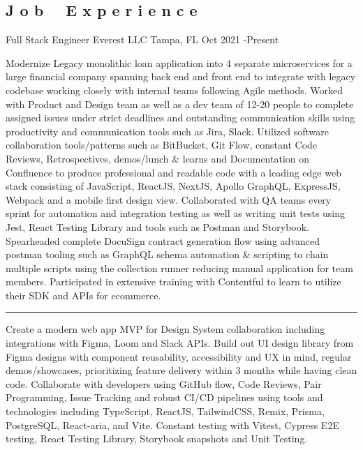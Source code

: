 \documentclass{resume}
\begin{document}

\subsection{J o b \ \ E x p e r i e n c e}

\jobInfoLocationDate
  {Full Stack Engineer}
  {Everest LLC}
  {Tampa, FL}
  {Oct 2021 \hyphen Present}


\begin{itemize}
\li Modernize Legacy monolithic loan application into 4 separate microservices for a large financial company spanning back end and front end to integrate with legacy codebase working closely with internal teams following Agile methods.
\li Worked with Product and Design team as well as a dev team of 12-20 people to complete assigned issues under strict deadlines and outstanding communication skills using productivity and communication tools such as Jira, Slack.
\li Utilized software collaboration tools/patterns such as BitBucket, Git Flow, constant Code Reviews, Retrospectives, demos/lunch \& learns  and Documentation on Confluence to produce professional and readable code with a leading edge web stack consisting of JavaScript, ReactJS, NextJS, Apollo GraphQL, ExpressJS, Webpack and a mobile first design view.
\li Collaborated with QA teams every sprint for automation and integration testing as well as writing unit tests using Jest, React Testing Library and tools such as Postman and Storybook.
\li Spearheaded complete DocuSign contract generation flow using advanced postman tooling such as GraphQL schema automation \& scripting to chain multiple scripts using the collection runner reducing manual application for team members.
\li Participated in extensive training with Contentful to learn to utilize their SDK and APIs for ecommerce.

\vspace{4pt} {\color{dividercolor}\hrule} \vspace{4pt}

\li Create a modern web app MVP for Design System collaboration including integrations with Figma, Loom and Slack APIs.
\li Build out UI design library from Figma designs with component reusability, accessibility and UX in mind, regular demos/showcases, prioritizing feature delivery within 3 months while having clean code.
\li Collaborate with developers using GitHub flow, Code Reviews, Pair Programming, Issue Tracking and robust CI/CD pipelines using tools and technologies including TypeScript, ReactJS, TailwindCSS, Remix, Prisma, PostgreSQL, React-aria, and Vite.
\li Constant testing with Vitest, Cypress E2E testing, React Testing Library, Storybook snapshots and Unit Testing.
\end{itemize}
\end{document}

